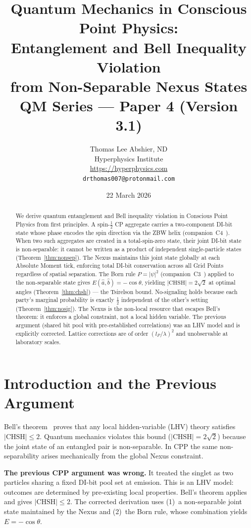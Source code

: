 \documentclass[11pt,a4paper]{article}
\title{\textbf{Quantum Mechanics in Conscious Point Physics:\\
Entanglement and Bell Inequality Violation\\
from Non-Separable Nexus States}\\[6pt]
{\large QM Series --- Paper 4 (Version 3.1)}}
\author{Thomas Lee Abshier, ND\\
Hyperphysics Institute\\
\url{https://hyperphysics.com}\\
\texttt{drthomas007@protonmail.com}}
\date{22 March 2026}
\newcommand{\lP}{l_P}
\begin{document}
\maketitle

\begin{abstract}
We derive quantum entanglement and Bell inequality violation in
Conscious Point Physics from first principles.  A spin-$\tfrac12$
CP aggregate carries a two-component DI-bit state whose phase encodes
the spin direction via the ZBW helix (companion~C4~\cite{abshier2026c4}).
When two such aggregates are created in a total-spin-zero state, their
joint DI-bit state is non-separable: it cannot be written as a product
of independent single-particle states (Theorem~\ref{thm:nonsep}).  The
Nexus maintains this joint state globally at each Absolute Moment tick,
enforcing total DI-bit conservation across all Grid Points regardless
of spatial separation.  The Born rule $P = |\psi|^2$
(companion~C3~\cite{abshier2026c3}) applied to the non-separable state
gives $E(\hat{a},\hat{b}) = -\cos\theta$, yielding $|\mathrm{CHSH}|
= 2\sqrt{2}$ at optimal angles (Theorem~\ref{thm:chsh}) --- the
Tsirelson bound.  No-signaling holds because each party's marginal
probability is exactly $\tfrac12$ independent of the other's setting
(Theorem~\ref{thm:nosig}).  The Nexus is the non-local resource that
escapes Bell's theorem: it enforces a global constraint, not a local
hidden variable.  The previous argument (shared bit pool with
pre-established correlations) was an LHV model and is explicitly
corrected.  Lattice corrections are of order $(\lP/\lambda)^2$ and
unobservable at laboratory scales.
\end{abstract}

\tableofcontents
\newpage

\section{Introduction and the Previous Argument}

Bell's theorem~\cite{bell1964} proves that any local hidden-variable
(LHV) theory satisfies $|\mathrm{CHSH}| \le 2$.  Quantum mechanics
violates this bound ($|\mathrm{CHSH}| = 2\sqrt{2}$) because the joint
state of an entangled pair is non-separable.  In CPP the same
non-separability arises mechanically from the global Nexus constraint.

\textbf{The previous CPP argument was wrong.}  It treated the singlet
as two particles sharing a fixed DI-bit pool set at emission.  This is
an LHV model: outcomes are determined by pre-existing local properties.
Bell's theorem applies and gives $|\mathrm{CHSH}| \le 2$.  The
corrected derivation uses (1)~a non-separable joint state maintained
by the Nexus and (2)~the Born rule, whose combination yields
$E = -\cos\theta$.
\end{document}
